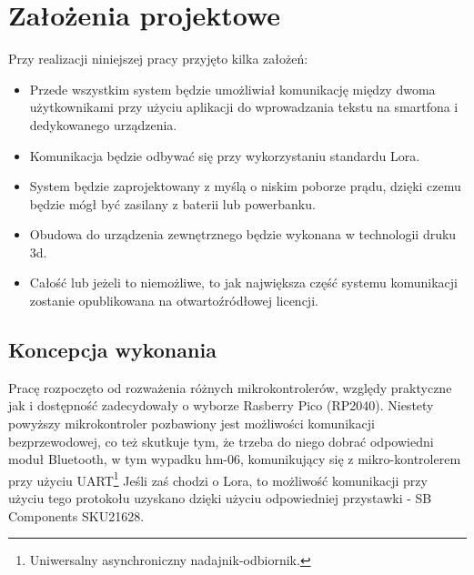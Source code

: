 \newpage %
\section{Założenia projektowe}
Przy realizacji niniejszej pracy przyjęto kilka założeń:
\begin{itemize}
	\item Przede wszystkim system będzie umożliwiał komunikację między dwoma użytkownikami przy użyciu aplikacji do wprowadzania tekstu na smartfona i dedykowanego urządzenia.
	\item Komunikacja będzie odbywać się przy wykorzystaniu standardu Lora.
	\item System będzie zaprojektowany z myślą o niskim poborze prądu, dzięki czemu będzie mógł być zasilany z baterii lub powerbanku.
	\item Obudowa do urządzenia zewnętrznego będzie wykonana w technologii druku 3d.
	\item Całość lub jeżeli to niemożliwe, to jak największa część systemu komunikacji zostanie opublikowana na otwartoźródłowej licencji.
\end{itemize}
\subsection{Koncepcja wykonania}
Pracę rozpoczęto od rozważenia różnych mikrokontrolerów, względy praktyczne jak i dostępność zadecydowały o wyborze Rasberry Pico (RP2040). Niestety powyższy mikrokontroler pozbawiony jest możliwości komunikacji bezprzewodowej, co też skutkuje tym, że trzeba do niego dobrać odpowiedni moduł Bluetooth, w tym wypadku hm-06, komunikujący się z mikro-kontrolerem przy użyciu UART\footnote{Uniwersalny asynchroniczny nadajnik-odbiornik.}
Jeśli zaś chodzi o Lora, to możliwość komunikacji przy użyciu tego protokołu uzyskano dzięki użyciu odpowiedniej przystawki - SB Components SKU21628.